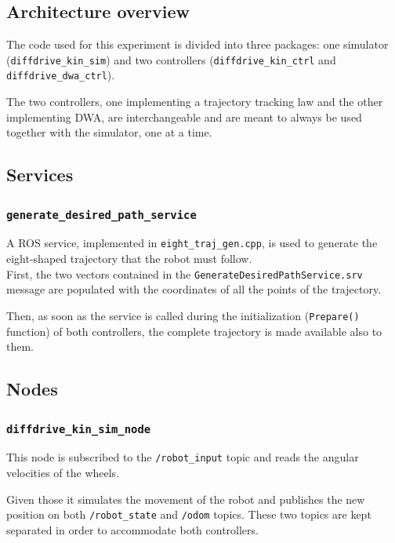 \documentclass[11pt,a4paper]{article}
\begin{document}
\subsection{Architecture overview}

The code used for this experiment is divided into three packages: one simulator (\texttt{diffdrive\_kin\_sim})
and two controllers (\texttt{diffdrive\_kin\_ctrl} and \texttt{diffdrive\_dwa\_ctrl}).

The two controllers, one implementing a trajectory tracking law and the other implementing DWA,
are interchangeable and are meant to always be used together with the simulator, one at a time.

\subsection{Services}

\subsubsection{\texttt{generate\_desired\_path\_service}}

A ROS service, implemented in \texttt{eight\_traj\_gen.cpp}, is used to generate the eight-shaped
trajectory that the robot must follow.\\

First, the two vectors contained in the \texttt{GenerateDesiredPathService.srv} message are populated
with the coordinates of all the points of the trajectory.

Then, as soon as the service is called during the initialization (\texttt{Prepare()} function) of both
controllers, the complete trajectory is made available also to them.



\subsection{Nodes}

\subsubsection{\texttt{diffdrive\_kin\_sim\_node}}

This node is subscribed to the \texttt{/robot\_input} topic and reads the angular velocities
of the wheels.

Given those it simulates the movement of the robot and publishes the new position on both
\texttt{/robot\_state} and \texttt{/odom} topics.
These two topics are kept separated in order to accommodate both controllers.\\
\end{document}
